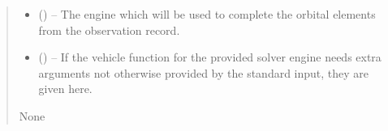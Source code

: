 \documentclass[letterpaper,11pt,english]{sphinxmanual}
\begin{document}
\begin{savenotes}
\begin{fulllineitems}
\begin{savenotes}
\begin{fulllineitems}
\begin{quote}
\begin{description}
\begin{itemize}
\item {} 
\sphinxAtStartPar
{} ({\hyperref[\detokenize{code/opihiexarata.library.engine:opihiexarata.library.engine.OrbitEngine}]{}}) – The engine which will be used to complete the orbital elements
from the observation record.

\item {} 
\sphinxAtStartPar
{} () – If the vehicle function for the provided solver engine needs
extra arguments not otherwise provided by the standard input,
they are given here.

\end{itemize}

\sphinxAtStartPar
None

\end{description}\end{quote}

\end{fulllineitems}\end{savenotes}


\end{fulllineitems}\end{savenotes}

\end{document}

